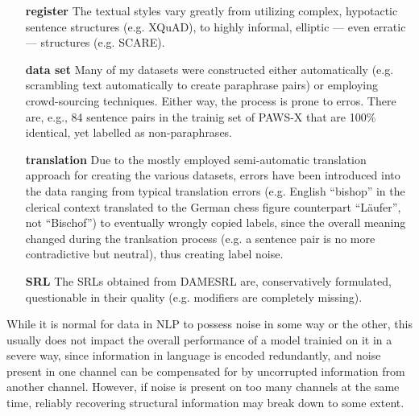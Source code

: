 \begin{itemize}
  \item[\textbf{register}] The textual styles vary greatly from utilizing complex,
                           hypotactic sentence structures (e.g. XQuAD), to highly
                           informal, elliptic --- even erratic --- structures
                           (e.g. SCARE).
 \item[\textbf{data set}] Many of my datasets were constructed either automatically
                         (e.g. scrambling text automatically to create paraphrase pairs)
                         or employing crowd-sourcing techniques. Either way, the process
                         is prone to erros. There are, e.g., 84 sentence pairs in the trainig
                         set of PAWS-X that are 100\% identical, yet labelled as non-paraphrases.
 \item[\textbf{translation}] Due to the mostly employed semi-automatic translation
                             approach for creating the various datasets, errors
                             have been introduced into the data ranging from typical
                             translation errors (e.g. English ``bishop'' in the clerical
                             context translated to the German chess figure counterpart
                             ``Läufer'', not ``Bischof'') to eventually wrongly copied
                             labels, since the overall meaning changed during
                             the tranlsation process (e.g. a sentence pair is no more
                             contradictive but neutral), thus creating label noise.
 \item[\textbf{SRL}] The SRLs obtained from DAMESRL are, conservatively formulated,
                     questionable in their quality (e.g. modifiers are completely missing).
\end{itemize}

While it is normal for data in NLP to possess noise in some way or the other, this usually does
not impact the overall performance of a model trainied on it in a severe way, since information
in language is encoded redundantly, and noise present in one channel can be compensated for by
uncorrupted information from another channel. However, if noise
is present on too many channels at the same time, reliably recovering structural information may
break down to some extent.



